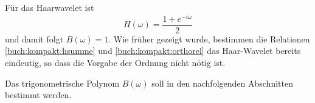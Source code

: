 \begin{beispiel}
Für das Haarwavelet ist
\[
H(\omega)
=
\frac{ 1+e^{-i\omega}}2
\]
und damit folgt $B(\omega)=1$.
Wie früher gezeigt wurde, bestimmen die Relationen 
\eqref{buch:kompakt:hsumme} und \eqref{buch:kompakt:orthorel}
das Haar-Wavelet bereits eindeutig, so dass die Vorgabe der Ordnung
nicht nötig ist.
\end{beispiel}

Das trigonometrische Polynom $B(\omega)$ soll in den nachfolgenden
Abschnitten bestimmt werden.


